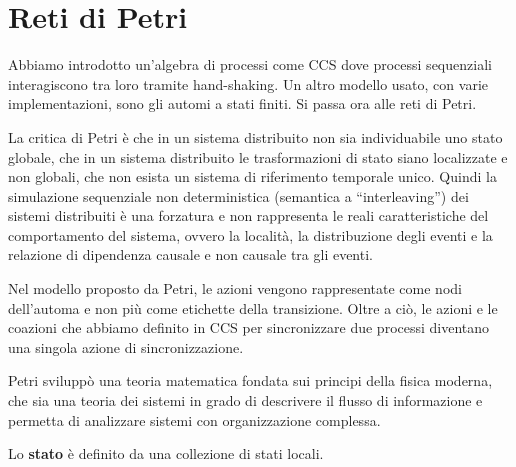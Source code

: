 \chapter{Reti di Petri}
Abbiamo introdotto un'algebra di processi come CCS dove processi sequenziali interagiscono tra loro tramite hand-shaking. Un altro modello usato, con varie implementazioni, sono gli automi a stati finiti. Si passa ora alle reti di Petri.

La critica di Petri è che in un sistema distribuito non sia individuabile uno stato globale, che in un sistema distribuito le trasformazioni di stato siano localizzate e non globali, che non esista un sistema di riferimento temporale unico. Quindi la simulazione sequenziale non deterministica (semantica a “interleaving”) dei sistemi distribuiti è una forzatura e non rappresenta le reali caratteristiche del comportamento del sistema, ovvero la località, la distribuzione degli eventi e la relazione di dipendenza causale e non causale tra gli eventi.

Nel modello proposto da Petri, le azioni vengono rappresentate come nodi dell'automa e non più come etichette della transizione. Oltre a ciò, le azioni e le coazioni che abbiamo definito in CCS per sincronizzare due processi diventano una singola azione di sincronizzazione.

Petri sviluppò una teoria matematica fondata sui principi della fisica moderna, che sia una teoria dei sistemi in grado di descrivere il flusso di informazione e permetta di analizzare sistemi con organizzazione complessa.

Lo \textbf{stato} è definito da una collezione di stati locali.

